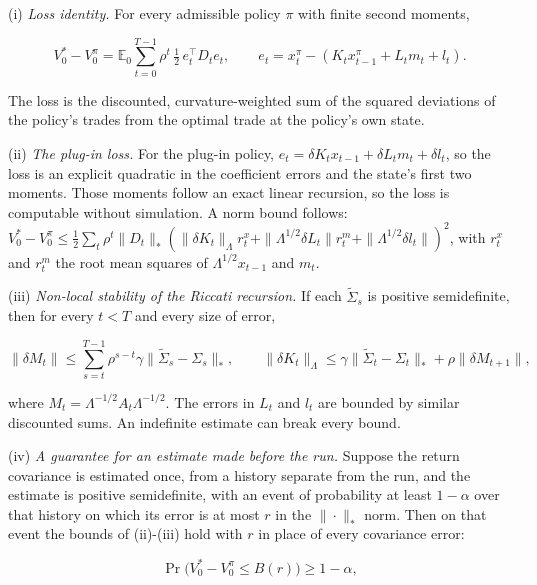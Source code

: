 \documentclass[11pt]{article}
\begin{document}
(i) \emph{Loss identity.} For every admissible policy \(\pi\) with finite
second moments,

\begin{equation*}
V^*_0-V^\pi_0=\mathbb E_0\sum_{t=0}^{T-1}\rho^t\,\tfrac12\,e_t^\top D_te_t,
\qquad e_t=x^\pi_t-(K_tx^\pi_{t-1}+L_tm_t+l_t).\tag{93}\label{eq:93}
\end{equation*}

The loss is the discounted, curvature-weighted sum of the squared
deviations of the policy's trades from the optimal trade at the
policy's own state.

(ii) \emph{The plug-in loss.} For the plug-in policy,
\(e_t=\delta K_tx_{t-1}+\delta L_tm_t+\delta l_t\), so the loss is an explicit
quadratic in the coefficient errors and the state's first two moments.
Those moments follow an exact linear recursion, so the loss is
computable without simulation. A norm bound follows:
\(V^*_0-V^\pi_0\leq\frac12\sum_t\rho^t\|D_t\|_*(\|\delta K_t\|_\Lambda r^x_t
+\|\Lambda^{1/2}\delta L_t\|r^m_t+\|\Lambda^{1/2}\delta l_t\|)^2\), with \(r^x_t\) and
\(r^m_t\) the root mean squares of \(\Lambda^{1/2}x_{t-1}\) and \(m_t\).

(iii) \emph{Non-local stability of the Riccati recursion.} If each
\(\tilde\Sigma_s\) is positive semidefinite, then for every \(t<T\) and every
size of error,

\begin{equation*}
\|\delta M_t\|\leq\sum_{s=t}^{T-1}\rho^{s-t}\gamma\|\tilde\Sigma_s-\Sigma_s\|_*,
\qquad
\|\delta K_t\|_\Lambda\leq\gamma\|\tilde\Sigma_t-\Sigma_t\|_*+\rho\|\delta M_{t+1}\|,\tag{94}\label{eq:94}
\end{equation*}

where \(M_t=\Lambda^{-1/2}A_t\Lambda^{-1/2}\). The errors in \(L_t\) and \(l_t\) are
bounded by similar discounted sums. An indefinite estimate can break
every bound.

(iv) \emph{A guarantee for an estimate made before the run.} Suppose the
return covariance is estimated once, from a history separate from
the run, and the estimate is positive semidefinite, with an event of
probability at least \(1-\alpha\) over that history on which its error
is at most \(r\) in the \(\|\cdot\|_*\) norm. Then on that event the bounds of
(ii)-(iii) hold with \(r\) in place of every covariance error:

\begin{equation*}
\Pr\bigl(V^*_0-V^\pi_0\leq B(r)\bigr)\geq1-\alpha,\tag{95}\label{eq:95}
\end{equation*}
\end{document}

